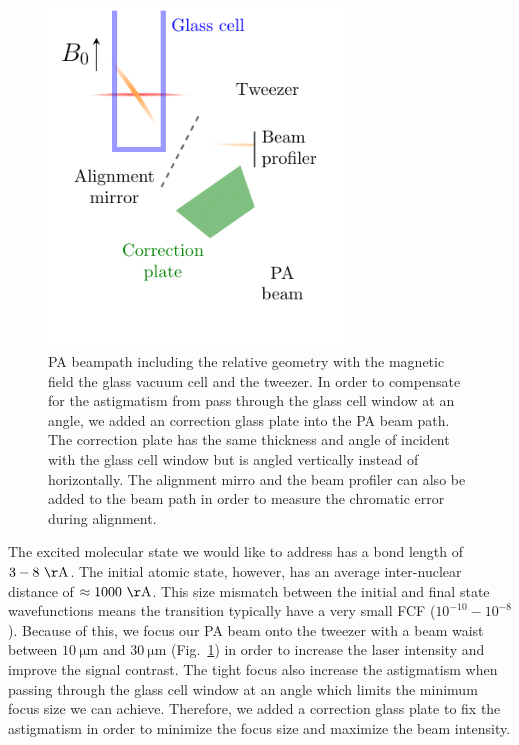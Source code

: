 \begin{figure}
  \centering
  \includegraphics[width=0.7\textwidth]{figures/pa_beampath.pdf}
  \caption[PA beampath]{
    PA beampath including the relative geometry with the magnetic field
    the glass vacuum cell and the tweezer.
    In order to compensate for the astigmatism from pass through the glass cell window
    at an angle, we added an correction glass plate into the PA beam path.
    The correction plate has the same thickness and angle of incident with the glass cell window
    but is angled vertically instead of horizontally.
    The alignment mirro and the beam profiler can also be added to the beam path
    in order to measure the chromatic error during alignment.
    \label{fig:pa:beampath}}
\end{figure}

The excited molecular state we would like to address has a bond length of $3-8~\mathrm{\AA}$.
The initial atomic state, however, has an average inter-nuclear distance of
$\approx1000~\mathrm{\AA}$.
This size mismatch between the initial and final state wavefunctions
means the transition typically have a very small FCF ($10^{-10}-10^{-8}$).
Because of this, we focus our PA beam onto the tweezer with a beam waist between
$10~\mathrm{\mu m}$ and $30~\mathrm{\mu m}$ (Fig.~\ref{fig:pa:beampath}) in order to
increase the laser intensity and improve the signal contrast.
The tight focus also increase the astigmatism when passing through
the glass cell window at an angle which limits the minimum focus size we can achieve.
Therefore, we added a correction glass plate to fix the astigmatism
in order to minimize the focus size and maximize the beam intensity.

